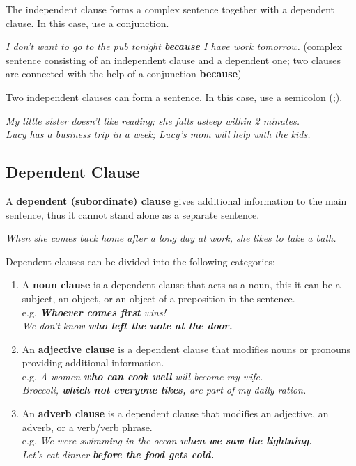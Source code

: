 \documentclass[hidelinks,10pt,a4paper]{article}
\begin{document}
\newpage
The independent clause forms a complex sentence together with a dependent clause. In this case, use a conjunction.

\begin{center}
	\textit{I don't want to go to the pub tonight \textbf{because} I have work tomorrow.} (complex sentence consisting of an independent clause and a dependent one; two clauses are connected with the help of a conjunction \textbf{because})
\end{center}

Two independent clauses can form a sentence. In this case, use a semicolon (;).

\begin{center}
	\textit{My little sister doesn't like reading; she falls asleep within 2 minutes.}\\
	\textit{Lucy has a business trip in a week; Lucy's mom will help with the kids.}
\end{center}

\subsection{Dependent Clause}
A \textbf{dependent (subordinate) clause} gives additional information to the main sentence, thus it cannot stand alone as a separate sentence.

\begin{center}
	\textit{When she comes back home after a long day at work, she likes to take a bath.}
\end{center}

Dependent clauses can be divided into the following categories:

\begin{enumerate}[label=(\alph*)]
	\item A \textbf{noun clause} is a dependent clause that acts as a noun, this it can be a subject, an object, or an object of a preposition in the sentence.\\
		e.g. \textit{\textbf{Whoever comes first} wins!}\\
		\textit{We don't know \textbf{who left the note at the door.} }

	\item An \textbf{adjective clause} is a dependent clause that modifies nouns or pronouns providing additional information. \\
		e.g. \textit{A women \textbf{who can cook well} will become my wife.}\\
		\textit{Broccoli, \textbf{which not everyone likes,} are part of my daily ration.}

	\item An \textbf{adverb clause} is a dependent clause that modifies an adjective, an adverb, or a verb/verb phrase.\\
		e.g. \textit{We were swimming in the ocean \textbf{when we saw the lightning.}\\
		Let's eat dinner \textbf{before the food gets cold.} }
\end{enumerate}
\end{document}
